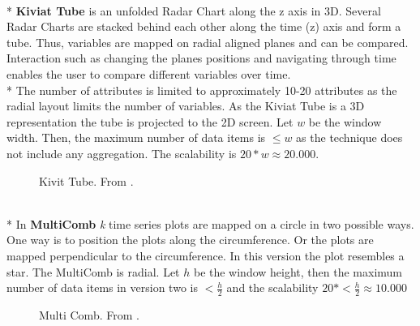\\*
\textbf{Kiviat Tube} is an unfolded Radar Chart along the z axis in 3D. Several Radar Charts are stacked behind each other along the time (z) axis and form a tube. Thus, variables are mapped on radial aligned planes and can be compared. Interaction such as changing the planes positions and navigating through time enables the user to compare different variables over time.\\*
The number of attributes is limited to approximately 10-20 attributes as the radial layout limits the number of variables. As the Kiviat Tube is a 3D representation the tube is projected to the 2D screen. Let $w$ be the window width. Then, the maximum number of data items is $\leq w$ as the technique does not include any aggregation. The scalability is $20*w\approx 20.000$.
\begin{figure}[H]
    \centering
    \caption{Kivit Tube. From \cite{Aigner2011}.}
    \label{fig:kiviattube}
\end{figure}
\\*
In \textbf{MultiComb} \textit{k} time series plots are mapped on a circle in two possible ways. One way is to position the plots along the circumference. Or the plots are mapped perpendicular to the circumference. In this version the plot resembles a star.  The MultiComb is radial. Let $h$ be the window height, then the maximum number of data items in version two is $< \frac{h}{2}$ and the scalability $20*< \frac{h}{2} \approx 10.000$
\begin{figure}[H]
    \centering
    \caption{Multi Comb. From \cite{Luo2012}.}
    \label{fig:multicomb}
\end{figure}
